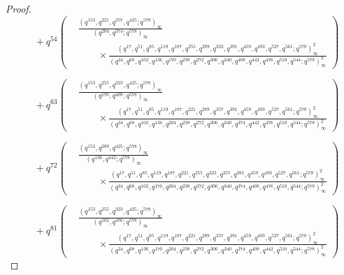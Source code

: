 \documentclass[11pt,a4paper]{article}
\numberwithin{equation}{section}
\theoremstyle{plain}
\begin{document}
\begin{proof}
	\[
	\quad +q^{54}\left(
	\begin{aligned}
			&\frac{(q^{153}, q^{221},  q^{357},  q^{425}; q^{578})_{\infty}}{(q^{204}, q^{374}; q^{578})_{\infty}} \\
			&\qquad \times
			\frac{(q^{17}, q^{51}, q^{85}, q^{119}, q^{187}, q^{255}, q^{289}, q^{323}, q^{391}, q^{459}, q^{493}, q^{527}, q^{561}; q^{578})_{\infty}^{2}}{(q^{34}, q^{68}, q^{102}, q^{136}, q^{170}, q^{238}, q^{272}, q^{306}, q^{340}, q^{408}, q^{442}, q^{476}, q^{510}, q^{544}; q^{578})_{\infty}^{2}} 
	\end{aligned}
	\right)
	\]
	
	\[
	\quad +q^{63}\left(
	\begin{aligned}
	&\frac{
		( q^{153}, q^{255}, q^{323}, q^{425}; q^{578})_{\infty}}{(q^{170}, q^{408}; q^{578})_{\infty}} \\
		&\qquad \times
		\frac{(q^{17}, q^{51}, q^{85}, q^{119}, q^{187}, q^{221}, q^{289}, q^{357}, q^{391}, q^{459}, q^{493}, q^{527}, q^{561}; q^{578})_{\infty}^{2}}{(q^{34}, q^{68}, q^{102}, q^{136}, q^{204}, q^{238}, q^{272}, q^{306}, q^{340}, q^{374}, q^{442}, q^{476}, q^{510}, q^{544}; q^{578})_{\infty}^{2}}
	\end{aligned}
	\right)
	\]
	
	
	\[
	\quad +q^{72}\left(
	\begin{aligned}
		&\frac{(q^{153}, q^{289}, q^{425}; q^{578})_{\infty}}{(q^{136}, q^{442}; q^{578})_{\infty}} \\
		&\qquad \times
		\frac{(q^{17}, q^{51}, q^{85}, q^{119}, q^{187}, q^{221}, q^{255}, q^{323}, q^{357}, q^{391}, q^{459}, q^{493}, q^{527}, q^{561}; q^{578})_{\infty}^{2}}{(q^{34}, q^{68}, q^{102}, q^{170}, q^{204}, q^{238}, q^{272}, q^{306}, q^{340}, q^{374}, q^{408}, q^{476}, q^{510}, q^{544}; q^{578})_{\infty}^{2}}
	\end{aligned}
	\right)
	\]
	
	\[
	\quad +q^{81}\left(
	\begin{aligned}
		&\frac{(q^{153}, q^{255}, q^{323}, q^{425}; q^{578})_{\infty}}{(q^{102}, q^{476}; q^{578})_{\infty}} \\
		&\qquad \times
		\frac{(q^{17}, q^{51}, q^{85}, q^{119}, q^{187}, q^{221}, q^{289}, q^{357}, q^{391}, q^{459}, q^{493}, q^{527}, q^{561}; q^{578})_{\infty}^{2}}{(q^{34}, q^{68}, q^{136}, q^{170},  q^{204}, q^{238}, q^{272}, q^{306}, q^{340}, q^{374}, q^{408}, q^{442}, q^{510}, q^{544}; q^{578})_{\infty}^{2}} 
	\end{aligned}\right)
	\]
	

\end{proof}
\end{document}
